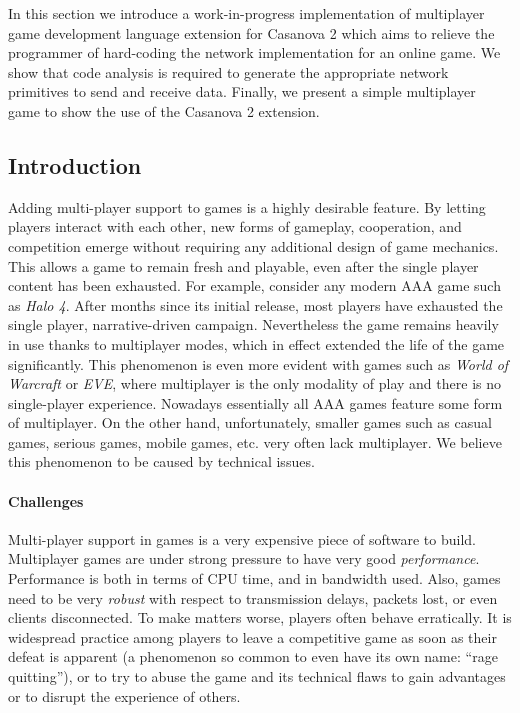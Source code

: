 In this section we introduce a work-in-progress implementation of multiplayer game development language extension for Casanova 2 which aims to relieve the programmer of hard-coding the network implementation for an online game. We show that code analysis is required to generate the appropriate network primitives to send and receive data. Finally, we present a simple multiplayer game to show the use of the Casanova 2 extension.

\subsection*{Introduction}
Adding multi-player support to games is a highly desirable feature. By letting players interact with each other, new forms of gameplay, cooperation, and competition emerge without requiring any additional design of game mechanics. This allows a game to remain fresh and playable, even after the single player content has been exhausted. For example, consider any modern AAA game such as \textit{Halo 4}. After months since its initial release, most players have exhausted the single player, narrative-driven campaign. Nevertheless the game remains heavily in use thanks to multiplayer modes, which in effect extended the life of the game significantly. This phenomenon is even more evident with games such as \textit{World of Warcraft} or \textit{EVE}, where multiplayer is the only modality of play and there is no single-player experience. Nowadays essentially all AAA games feature some form of multiplayer. On the other hand, unfortunately, smaller games such as casual games, serious games, mobile games, etc. very often lack multiplayer. We believe this phenomenon to be caused by technical issues.

\paragraph*{Challenges}
Multi-player support in games is a very expensive piece of software to build. Multiplayer games are under strong pressure to have very good \textit{performance}. Performance is both in terms of CPU time, and in bandwidth used. Also, games need to be very \textit{robust} with respect to transmission delays, packets lost, or even clients disconnected. To make matters worse, players often behave erratically. It is widespread practice among players to leave a competitive game as soon as their defeat is apparent (a phenomenon so common to even have its own name: ``rage quitting''), or to try to abuse the game and its technical flaws to gain advantages or to disrupt the experience of others.

